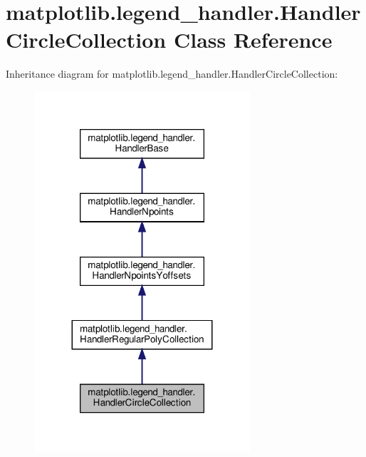\hypertarget{classmatplotlib_1_1legend__handler_1_1HandlerCircleCollection}{}\section{matplotlib.\+legend\+\_\+handler.\+Handler\+Circle\+Collection Class Reference}
\label{classmatplotlib_1_1legend__handler_1_1HandlerCircleCollection}


Inheritance diagram for matplotlib.\+legend\+\_\+handler.\+Handler\+Circle\+Collection\+:
\nopagebreak
\begin{figure}[H]
\begin{center}
\leavevmode
\includegraphics[width=227pt]{classmatplotlib_1_1legend__handler_1_1HandlerCircleCollection__inherit__graph}
\end{center}
\end{figure}


